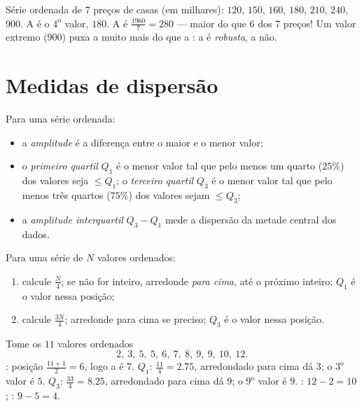 \begin{example}\label{ex:g10:stats:median}
Série ordenada de $7$ preços de casas (em milhares): $120$, $150$, $160$,
$180$, $210$, $240$, $900$. A  é o $4^{\text{o}}$ valor, $180$. A
 é $\frac{1960}{7} = 280$ --- maior do que $6$ dos $7$ preços! Um
valor extremo ($900$) puxa a  muito mais do que a : a 
é \emph{robusta}, a  não.
\end{example}

\section{Medidas de dispersão}

\begin{definition}\label{def:g10:stats:quartiles}
Para uma série ordenada:
\begin{itemize}
  \item a \emph{amplitude} é a diferença entre o maior e
        o menor valor;
  \item o \emph{primeiro quartil} $Q_1$ é o menor valor
        tal que pelo menos um quarto ($25\%$) dos valores seja
        $\leq Q_1$; o \emph{terceiro quartil} $Q_3$ é o menor valor tal
        que pelo menos três quartos ($75\%$) dos valores sejam
        $\leq Q_3$;
  \item a \emph{amplitude interquartil}
        $Q_3 - Q_1$ mede a dispersão da metade central dos dados.
\end{itemize}
\end{definition}

\begin{method}\label{met:g10:stats:quartiles}
Para uma série de $N$ valores ordenados:
\begin{enumerate}
  \item calcule $\frac N4$; se não for inteiro, arredonde \emph{para
        cima}, até o próximo inteiro; $Q_1$ é o valor nessa posição;
  \item calcule $\frac{3N}{4}$; arredonde para cima se preciso; $Q_3$ é o
        valor nessa posição.
\end{enumerate}
\end{method}

\begin{example}\label{ex:g10:stats:quartiles}
Tome os $11$ valores ordenados
\[
2,\ 3,\ 5,\ 5,\ 6,\ 7,\ 8,\ 9,\ 9,\ 10,\ 12 .
\]
: posição $\frac{11+1}{2} = 6$, logo a  é $7$.
$Q_1$: $\frac{11}{4} = 2.75$, arredondado para cima dá $3$; o
$3^{\text{o}}$ valor é $5$. $Q_3$: $\frac{33}{4} = 8.25$, arredondado
para cima dá $9$; o $9^{\text{o}}$ valor é $9$. : $12 - 2 = 10$;
: $9 - 5 = 4$.
\end{example}

